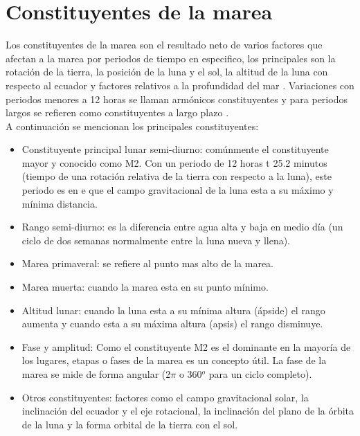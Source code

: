 \documentclass[12pt,letterpaper]{article}
\begin{document}

\section{Constituyentes de la marea}

Los constituyentes de la marea son el resultado neto de varios factores que afectan a la marea por periodos de tiempo en especifico, los principales son la rotación de la tierra, la posición de la luna y el sol, la altitud de la luna con respecto al ecuador y factores relativos a la profundidad del mar \cite{a}.
Variaciones con periodos menores a 12 horas se llaman armónicos constituyentes y para periodos largos se refieren como constituyentes a largo plazo \cite{a}.\\

A continuación se mencionan los principales constituyentes\cite{a}:

\begin{itemize}
\item Constituyente principal lunar semi-diurno: comúnmente el constituyente mayor y conocido como M2. Con un periodo de 12 horas t 25.2 minutos (tiempo de una rotación relativa de la tierra con respecto a la luna), este periodo es en e que el campo gravitacional de la luna esta a su máximo y mínima distancia.
\item Rango semi-diurno: es la diferencia entre agua alta y baja en medio día (un ciclo de dos semanas normalmente entre la luna nueva y llena).
\item Marea primaveral: se refiere al punto mas alto de la marea.
\item Marea muerta: cuando la marea esta en su punto mínimo.
\item Altitud lunar: cuando la luna esta a su mínima altura (ápside) el rango aumenta y cuando esta a su máxima altura (apsis) el rango disminuye.
\item Fase y amplitud: Como el constituyente M2 es el dominante en la mayoría de los lugares, etapas o fases de la marea es un concepto útil. La fase de la marea se mide de forma angular (2$\pi$ o 360$^{o}$ para un ciclo completo).
\item Otros constituyentes: factores como el campo gravitacional solar, la inclinación del ecuador y el eje rotacional, la inclinación del plano de la órbita de la luna y la forma orbital de la tierra con el sol.
\end{itemize}
\end{document}
